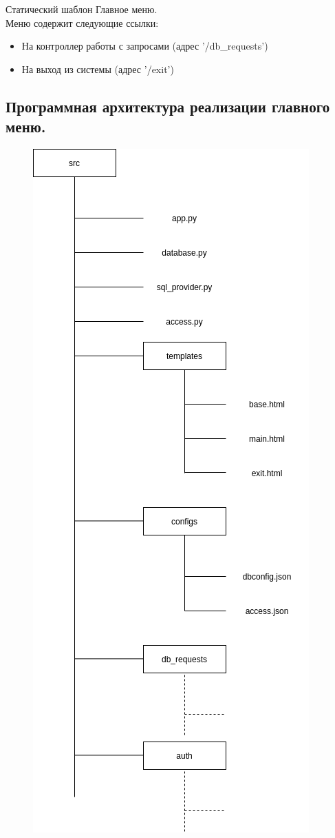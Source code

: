 \documentclass[12pt, a4paper]{article}
\begin{document}
   Статический шаблон Главное меню.
   \\
   Меню содержит следующие ссылки:
   \begin{itemize}
   	\item На контроллер работы с запросами (адрес '/db\_requests')
   	\item На выход из системы (адрес '/exit')
   \end{itemize}

	\newpage
	\subsection{Программная архитектура реализации главного меню.}
	 \begin{figure}[ht!]
		\centering    %
		\includegraphics[height=0.7\textheight]{pictures/main_menu_arch.png}

\end{figure}
\end{document}
